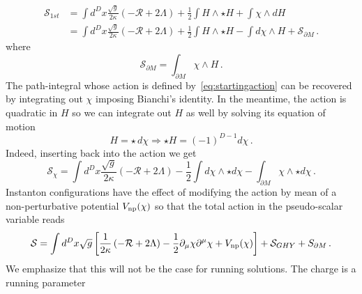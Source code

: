 \documentclass[a4paper]{article}
\begin{document}
\begin{equation}
  \begin{aligned}
    \mathcal{S}_{1st} &= \int d^Dx \frac{\sqrt{g}}{2\kappa}\left(-\mathcal{R}+2\Lambda\right) +\frac{1}{2}\int H \wedge \star H +  \int\chi \wedge dH\\
    &= \int d^Dx \frac{\sqrt{g}}{2\kappa}\left(-\mathcal{R}+2\Lambda\right) +\frac{1}{2}\int H \wedge \star H -  \int d\chi \wedge H + \mathcal{S}_{\partial M}\,.
  \end{aligned}
\end{equation}
where
\begin{equation}
  \mathcal{S}_{\partial M}= \int_{\partial M}\chi \wedge H\,.
\end{equation}
The path-integral whose action is defined by~\eqref{eq:startingaction} can be recovered by integrating out $\chi$ imposing Bianchi's identity. In the meantime, the action is quadratic in $H$ so we can integrate out $H$ as well by solving its equation of motion
\begin{equation}
  H =  \star \,d \chi \Rightarrow \star H = (-1)^{D-1} d \chi\,.
\end{equation}
Indeed, inserting back into the action we get
\begin{equation}
\mathcal{S}_{\chi} = \int d^Dx \frac{\sqrt{g}}{2\kappa}\left(-\mathcal{R}+2\Lambda\right) - \frac{1}{2} \int d \chi \wedge \star d\chi - \int_{\partial M} \chi \wedge \star d\chi\,.
\end{equation}
Instanton configurations have the effect of modifying the action by mean of a non-perturbative potential $V_{\rm np}(\chi)$ so that the total action in the pseudo-scalar variable reads
\begin{equation}\label{eq:liftnonperturbative}
  \mathcal{S}=\int d^Dx \sqrt{g}\left[\frac{1}{2\kappa}\left(-\mathcal{R}+2\Lambda\right)-\frac{1}{2}\partial_\mu\chi \partial^\mu \chi + V_{\rm np}(\chi)\right]+ \mathcal{S}_{GHY} + S_{\partial M}\,.
\end{equation}
We emphasize that this will not be the case for running solutions. The charge is a running parameter
\end{document}
